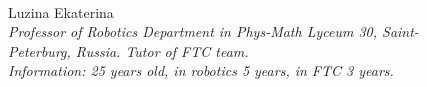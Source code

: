 \begin{figure}[H]
\begin{minipage}[h]{0.47\linewidth}
		\\
	\end{minipage}
	\hfill
	\begin{minipage}{0.47\linewidth}
		Luzina Ekaterina \\
		\emph{Professor of Robotics Department in Phys-Math Lyceum 30, Saint-Peterburg, Russia. Tutor of FTC team. \\}
		\emph{Information: 25 years old, in robotics 5 years, in FTC 3 years.}
	\end{minipage}
\end{figure}

